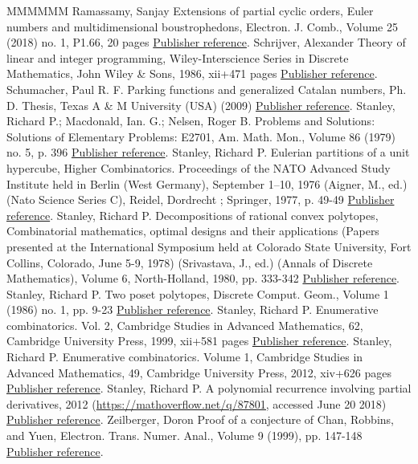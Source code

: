 \begin{thebibliography}{MMMMMM}
 Ramassamy, Sanjay Extensions of partial cyclic orders, Euler numbers and multidimensional boustrophedons, Electron. J. Comb., Volume 25 (2018) no. 1, P1.66, 20 pages \href{https://ahl.centre-mersenne.org/item/AHL_2020__3__275_0/#R17}{Publisher reference}.
 Schrijver, Alexander Theory of linear and integer programming, Wiley-Interscience Series in Discrete Mathematics, John Wiley \& Sons, 1986, xii+471 pages \href{https://ahl.centre-mersenne.org/item/AHL_2020__3__275_0/#schrijver-1986}{Publisher reference}.
 Schumacher, Paul R. F. Parking functions and generalized Catalan numbers, Ph. D. Thesis, Texas A \& M University (USA) (2009) \href{https://ahl.centre-mersenne.org/item/AHL_2020__3__275_0/#schumacher-2009}{Publisher reference}.
 Stanley, Richard P.; Macdonald, Ian. G.; Nelsen, Roger B. Problems and Solutions: Solutions of Elementary Problems: E2701, Am. Math. Mon., Volume 86 (1979) no. 5, p. 396 \href{https://ahl.centre-mersenne.org/item/AHL_2020__3__275_0/#SMN79}{Publisher reference}.
 Stanley, Richard P. Eulerian partitions of a unit hypercube, Higher Combinatorics. Proceedings of the NATO Advanced Study Institute held in Berlin (West Germany), September 1–10, 1976 (Aigner, M., ed.) (Nato Science Series C), Reidel, Dordrecht ; Springer, 1977, p. 49-49 \href{https://ahl.centre-mersenne.org/item/AHL_2020__3__275_0/#Sta77}{Publisher reference}.
 Stanley, Richard P. Decompositions of rational convex polytopes, Combinatorial mathematics, optimal designs and their applications (Papers presented at the International Symposium held at Colorado State University, Fort Collins, Colorado, June 5-9, 1978) (Srivastava, J., ed.) (Annals of Discrete Mathematics), Volume 6, North-Holland, 1980, pp. 333-342 \href{https://ahl.centre-mersenne.org/item/AHL_2020__3__275_0/#S80}{Publisher reference}.
 Stanley, Richard P. Two poset polytopes, Discrete Comput. Geom., Volume 1 (1986) no. 1, pp. 9-23 \href{https://ahl.centre-mersenne.org/item/AHL_2020__3__275_0/#S86}{Publisher reference}.
 Stanley, Richard P. Enumerative combinatorics. Vol. 2, Cambridge Studies in Advanced Mathematics, 62, Cambridge University Press, 1999, xii+581 pages \href{https://ahl.centre-mersenne.org/item/AHL_2020__3__275_0/#stanley-ec2}{Publisher reference}.
 Stanley, Richard P. Enumerative combinatorics. Volume 1, Cambridge Studies in Advanced Mathematics, 49, Cambridge University Press, 2012, xiv+626 pages \href{https://ahl.centre-mersenne.org/item/AHL_2020__3__275_0/#S12}{Publisher reference}.
 Stanley, Richard P. A polynomial recurrence involving partial derivatives, 2012 (\url{https://mathoverflow.net/q/87801,} accessed June 20 2018) \href{https://ahl.centre-mersenne.org/item/AHL_2020__3__275_0/#stanley-2012}{Publisher reference}.
 Zeilberger, Doron Proof of a conjecture of Chan, Robbins, and Yuen, Electron. Trans. Numer. Anal., Volume 9 (1999), pp. 147-148 \href{https://ahl.centre-mersenne.org/item/AHL_2020__3__275_0/#Z99}{Publisher reference}.
\end{thebibliography}
